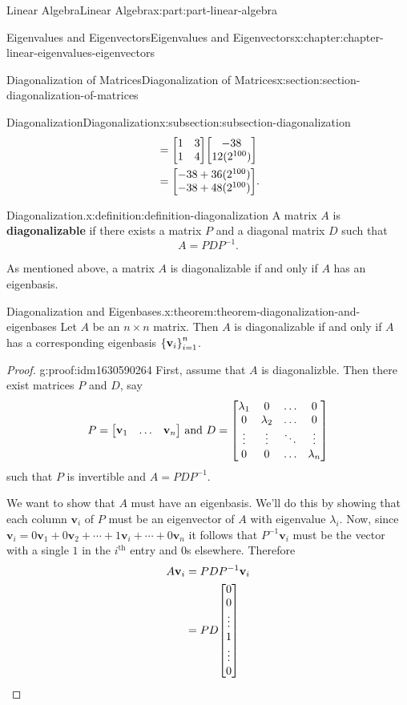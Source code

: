\documentclass[twoside,10pt,]{book}
\newcommand{\terminology}[1]{\textbf{#1}}
\numberwithin{equation}{part}
\renewcommand{\th}{\text{th}}
\newcommand{\vv}{\mathbf{v}}
\begin{document}
\begin{partptx}{Linear Algebra}{}{Linear Algebra}{}{}{x:part:part-linear-algebra}
\begin{chapterptx}{Eigenvalues and Eigenvectors}{}{Eigenvalues and Eigenvectors}{}{}{x:chapter:chapter-linear-eigenvalues-eigenvectors}
\begin{sectionptx}{Diagonalization of Matrices}{}{Diagonalization of Matrices}{}{}{x:section:section-diagonalization-of-matrices}
\begin{subsectionptx}{Diagonalization}{}{Diagonalization}{}{}{x:subsection:subsection-diagonalization}
\begin{align*}
& = \mqty[1 & 3 \\ 1 & 4]\mqty[-38 \\ 12(2^{100})] \\
& = \mqty[-38 + 36(2^{100}) \\ -38 + 48(2^{100})] \text{.}
\end{align*}
%
\begin{definition}{Diagonalization.}{x:definition:definition-diagonalization}%
A matrix \(A\) is \terminology{diagonalizable} if there exists a matrix \(P\) and a diagonal matrix \(D\) such that%
\begin{equation*}
A = PDP^{-1}\text{.}
\end{equation*}
%
\end{definition}
As mentioned above, a matrix \(A\) is diagonalizable if and only if \(A\) has an eigenbasis.%
\begin{theorem}{Diagonalization and Eigenbases.}{}{x:theorem:theorem-diagonalization-and-eigenbases}%
Let \(A\) be an \(n\times n\) matrix. Then \(A\) is diagonalizable if and only if \(A\) has a corresponding eigenbasis \(\qty{\vv_i}_{i=1}^n\).%
\end{theorem}
\begin{proof}{}{g:proof:idm1630590264}
First, assume that \(A\) is diagonalizble. Then there exist matrices \(P\) and \(D\), say%
\begin{equation*}
P = \mqty[\vv_1&\ldots&\vv_n]\text{ and }D = \mqty[\lambda_1 & 0 & \ldots & 0 \\ 0 & \lambda_2 & \ldots & 0 \\ \vdots & \vdots & \ddots & \vdots \\ 0 & 0 & \ldots & \lambda_n]
\end{equation*}
such that \(P\) is invertible and \(A = PDP^{-1}\).%
\par
We want to show that \(A\) must have an eigenbasis. We'll do this by showing that each column \(\vv_i\) of \(P\) must be an eigenvector of \(A\) with eigenvalue \(\lambda_i\). Now, since \(\vv_i = 0\vv_1 + 0\vv_2 + \cdots + 1\vv_i + \cdots + 0\vv_n\) it follows that \(P^{-1}\vv_i\) must be the vector with a single \(1\) in the \(i^\th\) entry and \(0\)s elsewhere. Therefore%
\begin{align*}
A\vv_i & = PDP^{-1}\vv_i \\
& = PD\mqty[0\\0\\\vdots\\1\\\vdots\\0] \\

\end{align*}
\end{proof}
\end{subsectionptx}
\end{sectionptx}
\end{chapterptx}
\end{partptx}
\end{document}
